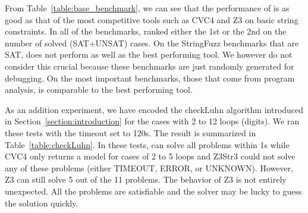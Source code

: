 From Table~\ref{table:base_benchmark}, we can see that the performance of {\tool} is as good as that of the most competitive tools such as CVC4 and Z3 on basic string constraints. In all of the benchmarks, {\tool} ranked either the 1st or the 2nd on the number of solved (SAT+UNSAT) cases. On the StringFuzz benchmarks that are SAT, {\tool} does not perform as well as the best performing tool. We however do not consider this crucial because these benchmarks are just randomly generated for debugging. On the most important benchmarks, those that come from program analysis, {\tool} is comparable to the best performing tool.



As an addition experiment, we have encoded the checkLuhn algorithm introduced in Section~\ref{section:introduction} for the cases with 2 to 12 loops (digits). We ran these tests 
with the timeout set to 120s. The result is summarized in Table~\ref{table:checkLuhn}.
In these tests, {\tool} can solve all problems within 1s while CVC4 only returns a model for cases of 2 to 5 loops and Z3Str3 could not solve any of these problems (either TIMEOUT, ERROR, or UNKNOWN). However, Z3 can still solve 5 out of the 11 problems. The behavior of Z3 is not entirely unexpected. All the problems are satisfiable and the solver may be lucky to guess the solution quickly. %


